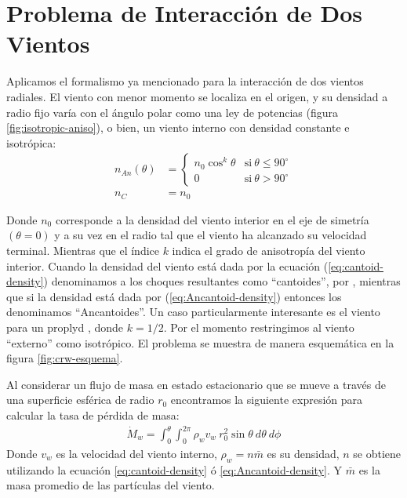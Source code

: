\section[Interacción de Dos Vientos]{Problema de Interacción de Dos Vientos}
\label{sec:CRW-2-winds}
Aplicamos el formalismo ya mencionado para la interacción de dos vientos radiales. El viento con menor momento se localiza en el origen, y su densidad a radio fijo varía con el ángulo polar como una ley de potencias (figura \ref{fig:isotropic-aniso}), o bien, un viento interno con densidad constante e isotrópica:
\begin{align}
  n_{An}(\theta) &=\left\lbrace
  \begin{array}{lr}
    n_0\cos^k\theta  & \mathrm{si~}\theta\leq 90^\circ \\
    0 & \mathrm{si~}\theta > 90^\circ
  \end{array}\right. \label{eq:Ancantoid-density}\\
  n_C &= n_0 \label{eq:cantoid-density}
\end{align}

Donde $n_0$ corresponde a la densidad del viento interior en el eje de simetría $(\theta=0)$ y a su vez en el radio tal que el viento ha alcanzado su velocidad terminal. Mientras que el índice $k$ indica el grado de anisotropía del viento interior. Cuando la densidad del viento está dada por la ecuación (\ref{eq:cantoid-density}) denominamos a los choques resultantes como ``cantoides'', por \citet{Canto:1996}, mientras que si la densidad está dada por (\ref{eq:Ancantoid-density}) entonces los denominamos ``Ancantoides''. Un caso particularmente interesante es el viento para un proplyd \citep{HA:1998}, donde $k=1/2$. Por el momento restringimos al viento ``externo'' como isotrópico. El problema se muestra de manera esquemática en la figura \ref{fig:crw-esquema}.

Al considerar un flujo de masa en estado estacionario que se mueve a través de una superficie esférica de radio $r_0$ encontramos la siguiente expresión para calcular la tasa de pérdida de masa:
\begin{align}
  \dot{M}_w = \int^\theta_0\int^{2\pi}_0\rho_w v_w~r^2_0\sin\theta~d\theta~d\phi  \label{eq:general-inner-dot-M}
\end{align}
Donde $v_w$ es la velocidad del viento interno, $\rho_w = n\bar{m}$  es su densidad, $n$ se obtiene utilizando la ecuación \ref{eq:cantoid-density} ó \ref{eq:Ancantoid-density}. Y $\bar{m}$  es la masa promedio de las partículas del viento.


